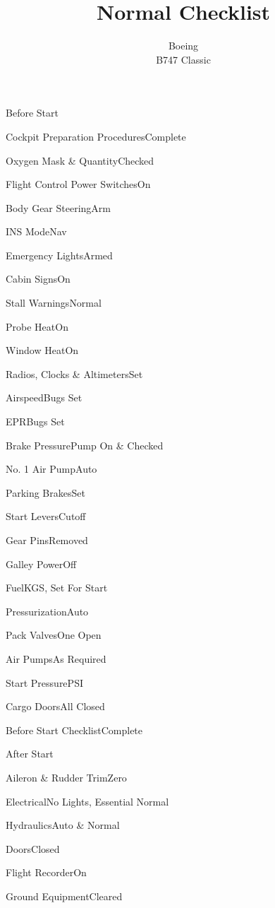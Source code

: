 \documentclass[sim-use, blue_items, halfpage]{checklist}
\title{Normal Checklist}
\subtitle{Boeing \\ B747 Classic}
\begin{document}
\begin{checklist}{Before Start}
	\item{Cockpit Preparation Procedures}{Complete}
	\item{Oxygen Mask \& Quantity}{Checked}
	\item{Flight Control Power Switches}{On}
	\item{Body Gear Steering}{Arm}
	\item{INS Mode}{Nav}
	\item{Emergency Lights}{Armed}
	\item{Cabin Signs}{On}
	\item{Stall Warnings}{Normal}
	\item{Probe Heat}{On}
	\item{Window Heat}{On}
	\item{Radios, Clocks \& Altimeters}{Set}
	\item{Airspeed}{Bugs Set}
	\item{EPR}{Bugs Set}
	\item{Brake Pressure}{Pump On \& Checked}
	 {
		\item{No. 1 Air Pump}{Auto}
	}
	\item{Parking Brakes}{Set}
	\item{Start Levers}{Cutoff}
	\item{Gear Pins}{Removed}
	\item{Galley Power}{Off}
	\item{Fuel}{\blank KGS, Set For Start}
	\item{Pressurization}{Auto}
	\item{Pack Valves}{One Open}
	\item{Air Pumps}{As Required}
	\item{Start Pressure}{\blank PSI}
	\item{Cargo Doors}{All Closed}
	\item{Before Start Checklist}{Complete}
\end{checklist}

\begin{checklist}{After Start}
	\item{Aileron \& Rudder Trim}{Zero}
	\item{Electrical}{No Lights, Essential Normal}
	\item{Hydraulics}{Auto \& Normal}
	\item{Doors}{Closed}
	\item{Flight Recorder}{On}
	\item{Ground Equipment}{Cleared}
\end{checklist}
\end{document}
